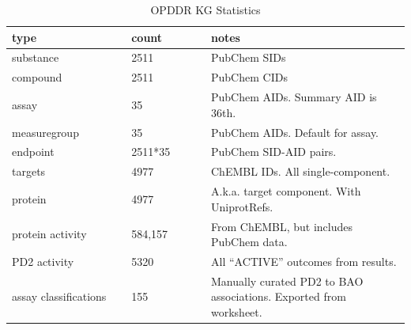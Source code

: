 \begin{table}
\caption{OPDDR KG Statistics}
\label{tab:opddr_03}
\centering
\begin{tabular}{p{0.3\linewidth}p{0.2\linewidth}p{0.5\linewidth}}
\hline
\textbf{type} & \textbf{count} & \textbf{notes}\\
\hline
substance & 2511 & PubChem SIDs\\
compound & 2511 & PubChem CIDs\\
assay & 35 & PubChem AIDs.  Summary AID is 36th.\\
measuregroup & 35 & PubChem AIDs.  Default for assay.\\
endpoint & 2511*35 & PubChem SID-AID pairs.\\
targets & 4977 & ChEMBL IDs.  All single-component.\\
protein & 4977 & A.k.a. target component.  With UniprotRefs.\\
protein activity & 584,157 & From ChEMBL, but includes PubChem data.\\
PD2 activity & 5320 & All “ACTIVE” outcomes from results.\\
assay classifications & 155 & Manually curated PD2 to BAO associations.  Exported from worksheet.\\
\hline
\end{tabular}
\end{table}

